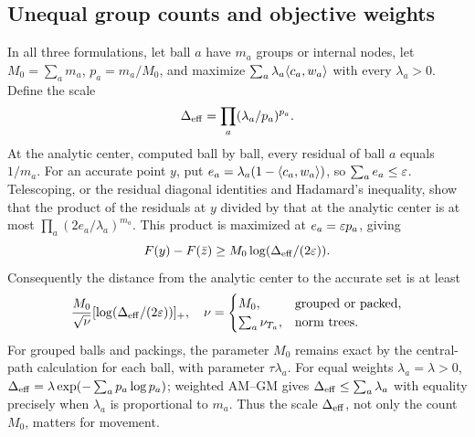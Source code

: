 \subsection{Unequal group counts and objective weights}
In all three formulations, let ball $a$ have $m_a$ groups or internal nodes, let $M_0=\sum_am_a$, $p_a=m_a/M_0$, and maximize
$\sum_a\lambda_a\langle c_a,w_a\rangle$ with every $\lambda_a>0$.
Define the scale
\begin{equation}
 \Delta_{\rm eff}=\prod_a(\lambda_a/p_a)^{p_a}.
 \label{eq:formulation-entropy}
\end{equation}
At the analytic center, computed ball by ball, every residual of ball
$a$ equals $1/m_a$. For an accurate point $y$, put
$e_a=\lambda_a(1-\langle c_a,w_a\rangle)$, so $\sum_a e_a\leq\varepsilon$.
Telescoping, or the residual diagonal identities and Hadamard's
inequality, show that the product of the residuals at $y$ divided by
that at the analytic center is at most
$\prod_a(2e_a/\lambda_a)^{m_a}$.
This product is maximized at $e_a=\varepsilon p_a$, giving
\[
 F(y)-F(\bar z)\geq M_0\log(\Delta_{\rm eff}/(2\varepsilon)).
\]
Consequently the distance from the analytic center to the accurate
set is at least
\begin{equation}
 \frac{M_0}{\sqrt\nu}[\log(\Delta_{\rm eff}/(2\varepsilon))]_+,
 \quad
 \nu=\begin{cases}M_0,&\text{grouped or packed},\\
                   \sum_a\nu_{T_a},&\text{norm trees}.
       \end{cases}
 \label{eq:heterogeneous-formulation-distance}
\end{equation}
For grouped balls and packings, the parameter $M_0$ remains exact by
the central-path calculation for each ball, with parameter
$\tau\lambda_a$.
For equal weights $\lambda_a=\lambda>0$,
$\Delta_{\rm eff}=\lambda\exp(-\sum_ap_a\log p_a)$;
weighted AM--GM gives $\Delta_{\rm eff}\leq\sum_a\lambda_a$ with
equality precisely when $\lambda_a$ is proportional to $m_a$.
Thus the scale $\Delta_{\rm eff}$, not only the count $M_0$, matters
for movement.
